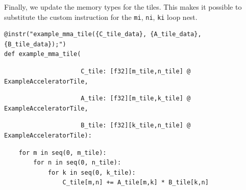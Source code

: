 \hfill
\begin{minipage}[t]{0.5\textwidth}\codeminipage
Finally, we update the memory types for the tiles.
This makes it possible to substitute the custom instruction for the \texttt{mi}, \texttt{ni}, \texttt{ki} loop nest.
\vspace{6mm}
{\tiny
\begin{verbatim}
@instr("example_mma_tile({C_tile_data}, {A_tile_data}, {B_tile_data});")
def example_mma_tile(
\end{verbatim}
\begin{mdframed}[style=MyFrame, backgroundcolor=violetBoxBg]
\color{violetBoxFg}
\begin{verbatim}
                     C_tile: [f32][m_tile,n_tile] @ ExampleAcceleratorTile,
\end{verbatim}
\end{mdframed}
\begin{mdframed}[style=MyFrame, backgroundcolor=yellowBoxBg]
\color{yellowBoxFg}
\begin{verbatim}
                     A_tile: [f32][m_tile,k_tile] @ ExampleAcceleratorTile,
\end{verbatim}
\end{mdframed}
\begin{mdframed}[style=MyFrame, backgroundcolor=greenBoxBg]
\color{greenBoxFg}
\begin{verbatim}
                     B_tile: [f32][k_tile,n_tile] @ ExampleAcceleratorTile):
\end{verbatim}
\end{mdframed}
\begin{verbatim}
    for m in seq(0, m_tile):
        for n in seq(0, n_tile):
            for k in seq(0, k_tile):
                C_tile[m,n] += A_tile[m,k] * B_tile[k,n]


\end{verbatim}}
\end{minipage}
